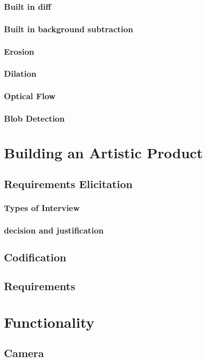 \documentclass[a4paper]{report}
\begin{document}
\subsection{Built in diff}
\subsection{Built in background subtraction}
\subsection{Erosion}
\subsection{Dilation}
\subsection{Optical Flow}
\subsection{Blob Detection}

\chapter{Building an Artistic Product}
\section{Requirements Elicitation}
\subsection{Types of Interview}
\subsection{decision and justification}
\section{Codification}
\section{Requirements}

\chapter{Functionality}
\section{Camera}
\end{document}
